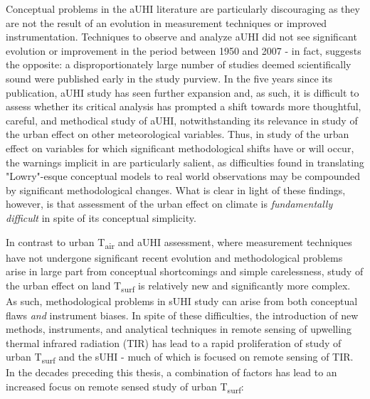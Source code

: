 \begin{bibunit}
Conceptual problems in the aUHI literature are particularly discouraging as they are not the result of an evolution in measurement techniques or improved instrumentation. Techniques to observe and analyze aUHI did not see significant evolution or improvement in the period between 1950 and 2007 - in fact, \citet{Stewart2011} suggests the opposite: a disproportionately large number of studies deemed scientifically sound were published early in the study purview. In the five years since its publication, aUHI study has seen further expansion and, as such, it is difficult to assess whether its critical analysis has prompted a shift towards more thoughtful, careful, and methodical study of aUHI, notwithstanding its relevance in study of the urban effect on other meteorological variables. Thus, in study of the urban effect on variables for which significant methodological shifts have or will occur, the warnings implicit in \citet{Stewart2011} are particularly salient, as difficulties found in translating "Lowry"-esque conceptual models to real world observations may be compounded by significant methodological changes. What is clear in light of these findings, however, is that assessment of the urban effect on climate is \textit{fundamentally difficult} in spite of its conceptual simplicity. 


In contrast to urban T\textsubscript{air} and aUHI assessment, where measurement techniques have not undergone significant recent evolution and methodological problems arise in large part from conceptual shortcomings and simple carelessness, study of the urban effect on land T\textsubscript{surf} is relatively new and significantly more complex. As such, methodological problems in sUHI study can arise from both conceptual flaws \textit{and} instrument biases. In spite of these difficulties, the introduction of new methods, instruments, and analytical techniques in remote sensing of upwelling thermal infrared radiation (TIR) has lead to a rapid proliferation of study of urban T\textsubscript{surf} and the sUHI - much of which is focused on remote sensing of TIR. In the decades preceding this thesis, a combination of factors has lead to an increased focus on remote sensed study of urban T\textsubscript{surf}: 


\end{bibunit}
